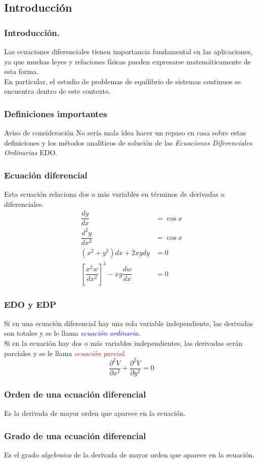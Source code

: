 \subsection{Introducción}
\begin{frame}
\frametitle{Introducción.}
Las ecuaciones diferenciales tienen importancia fundamental en las aplicaciones, ya que muchas leyes y relaciones físicas pueden expresarse matemáticamente de esta forma.
\\
\medskip
En particular, el estudio de problemas de equilibrio de sistemas continuos se encuentra dentro de este contexto.
\end{frame}
\begin{frame}
\frametitle{Definiciones importantes}
\begin{block}{Aviso de consideración}
	No sería mala idea hacer un repaso en casa sobre estas definiciones y los métodos analíticos de solución de las	 \textit{Ecuaciones Diferenciales Ordinarias} EDO.
\end{block}
\end{frame}
\begin{frame}
\frametitle{Ecuación diferencial}
Esta ecuación relaciona dos o más variables en términos de derivadas o diferenciales.
\\
\begin{align*}
\dfrac{dy}{dx} & =  \cos x \\
\dfrac{d^{2} y}{dx^{2}} & =   \cos x \\
( x^{2} + y^{2} ) dx + 2 xy dy & =  0 \\
\left[ \dfrac{x^{2} w}{dx^{2}} \right]^{3} - xy \dfrac{dw}{dx} & = 0 
\end{align*}
\end{frame}
\begin{frame}
\frametitle{EDO y EDP}
Si en una ecuación diferencial hay una sola variable independiente, las derivadas son totales y se le llama \textcolor{blue}{\textit{ecuación ordinaria}}.
\\
\medskip
\pause
Si en la ecuación hay dos o más variables independientes, las derivadas serán parciales y se le llama \textcolor{red}{\textit{ecuación parcial}}.
\[ \dfrac{\partial^{2} V}{\partial x^{2}} + \dfrac{\partial^{2} V}{\partial y^{2}} = 0\]
\end{frame}
\begin{frame}
\frametitle{Orden de una ecuación diferencial}
Es la derivada de mayor orden que aparece en la ecuación.
\end{frame}
\begin{frame}
\frametitle{Grado de una ecuación diferencial}
Es el grado \textit{algebraico} de la derivada de mayor orden que aparece en la ecuación.
\end{frame}
